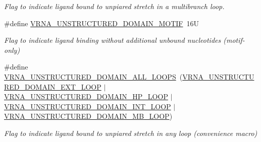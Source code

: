 \begin{DoxyCompactItemize}
\begin{DoxyCompactList}\small\item\em Flag to indicate ligand bound to unpiared stretch in a multibranch loop. \end{DoxyCompactList}\item 
\#define \hyperlink{group__domains__up_gaab12b58d59be76446a9f76fad2fe624c}{V\+R\+N\+A\+\_\+\+U\+N\+S\+T\+R\+U\+C\+T\+U\+R\+E\+D\+\_\+\+D\+O\+M\+A\+I\+N\+\_\+\+M\+O\+T\+IF}~16U\hypertarget{group__domains__up_gaab12b58d59be76446a9f76fad2fe624c}{}\label{group__domains__up_gaab12b58d59be76446a9f76fad2fe624c}

\begin{DoxyCompactList}\small\item\em Flag to indicate ligand binding without additional unbound nucleotides (motif-\/only) \end{DoxyCompactList}\item 
\#define \hyperlink{group__domains__up_ga3c6be4cce70f1af9e885788856101699}{V\+R\+N\+A\+\_\+\+U\+N\+S\+T\+R\+U\+C\+T\+U\+R\+E\+D\+\_\+\+D\+O\+M\+A\+I\+N\+\_\+\+A\+L\+L\+\_\+\+L\+O\+O\+PS}~(\hyperlink{group__domains__up_gaac911374e86236a51bfd42e1f098eaba}{V\+R\+N\+A\+\_\+\+U\+N\+S\+T\+R\+U\+C\+T\+U\+R\+E\+D\+\_\+\+D\+O\+M\+A\+I\+N\+\_\+\+E\+X\+T\+\_\+\+L\+O\+OP} $\vert$ \hyperlink{group__domains__up_ga23b610ea9564346c45cc1e2bbb62adf7}{V\+R\+N\+A\+\_\+\+U\+N\+S\+T\+R\+U\+C\+T\+U\+R\+E\+D\+\_\+\+D\+O\+M\+A\+I\+N\+\_\+\+H\+P\+\_\+\+L\+O\+OP} $\vert$ \hyperlink{group__domains__up_gac4a0feccd9654c149203200248c2716b}{V\+R\+N\+A\+\_\+\+U\+N\+S\+T\+R\+U\+C\+T\+U\+R\+E\+D\+\_\+\+D\+O\+M\+A\+I\+N\+\_\+\+I\+N\+T\+\_\+\+L\+O\+OP} $\vert$ \hyperlink{group__domains__up_ga67b80796655e5227a4ed662bfbe398b0}{V\+R\+N\+A\+\_\+\+U\+N\+S\+T\+R\+U\+C\+T\+U\+R\+E\+D\+\_\+\+D\+O\+M\+A\+I\+N\+\_\+\+M\+B\+\_\+\+L\+O\+OP})\hypertarget{group__domains__up_ga3c6be4cce70f1af9e885788856101699}{}\label{group__domains__up_ga3c6be4cce70f1af9e885788856101699}

\begin{DoxyCompactList}\small\item\em Flag to indicate ligand bound to unpiared stretch in any loop (convenience macro) \end{DoxyCompactList}\end{DoxyCompactItemize}
